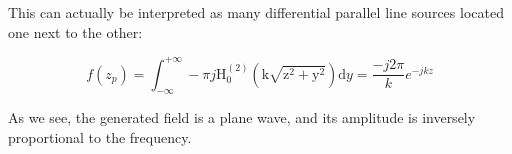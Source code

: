 This can actually be interpreted as many differential parallel line sources located one next to the other:

\begin{equation}
f(z_p) = \int_{-\infty}^{+\infty} -\pi j \mathrm{H_0^{(2)}(k \sqrt{z^2 + y^2})} \mathrm{d}y = \frac{-j 2\pi}{k} e^{-j k z}
\end{equation}

As we see, the generated field is a plane wave, and its amplitude is inversely proportional to the frequency.

